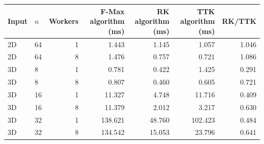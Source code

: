 \begin{tabular}{llrrrrr}
\hline
Input & $n$ & Workers & F-Max algorithm (ms) & RK algorithm (ms) & TTK algorithm (ms) & RK/TTK \\
\hline
2D & 64 & 1 & 1.443 & 1.145 & 1.057 & 1.046 \\
2D & 64 & 8 & 1.476 & 0.757 & 0.721 & 1.086 \\
3D & 8 & 1 & 0.781 & 0.422 & 1.425 & 0.291 \\
3D & 8 & 8 & 0.807 & 0.460 & 0.605 & 0.721 \\
3D & 16 & 1 & 11.327 & 4.748 & 11.716 & 0.409 \\
3D & 16 & 8 & 11.379 & 2.012 & 3.217 & 0.630 \\
3D & 32 & 1 & 138.621 & 48.760 & 102.423 & 0.484 \\
3D & 32 & 8 & 134.542 & 15.053 & 23.796 & 0.641 \\
\hline
\end{tabular}

